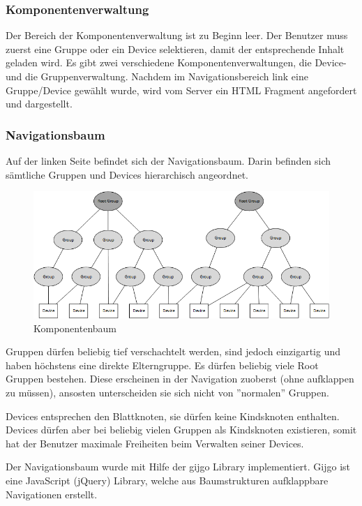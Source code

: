 \subsubsection{Komponentenverwaltung}
Der Bereich der Komponentenverwaltung ist zu Beginn leer. Der Benutzer muss zuerst eine Gruppe oder ein Device selektieren, damit der entsprechende Inhalt geladen wird. Es gibt zwei verschiedene Komponentenverwaltungen, die Device- und die Gruppenverwaltung. Nachdem im Navigationsbereich link eine Gruppe/Device gewählt wurde, wird vom Server ein HTML Fragment angefordert und dargestellt.

\subsubsection{Navigationsbaum}
Auf der linken Seite befindet sich der Navigationsbaum. Darin befinden sich sämtliche Gruppen und Devices hierarchisch angeordnet. 

\begin{figure}[H]
\centering
\includegraphics[scale=0.84]{../04_Realisierung/images/userinterface/componentstree.png}
\caption{Komponentenbaum}
\end{figure}

Gruppen dürfen beliebig tief verschachtelt werden, sind jedoch einzigartig und haben höchstens eine direkte Elterngruppe. Es dürfen beliebig viele Root Gruppen bestehen. Diese erscheinen in der Navigation zuoberst (ohne aufklappen zu müssen), ansosten unterscheiden sie sich nicht von ''normalen'' Gruppen. 

Devices entsprechen den Blattknoten, sie dürfen keine Kindsknoten enthalten. Devices dürfen aber bei beliebig vielen Gruppen als Kindsknoten existieren, somit hat der Benutzer maximale Freiheiten beim Verwalten seiner Devices.

Der Navigationsbaum wurde mit Hilfe der gijgo Library implementiert. Gijgo ist eine JavaScript (jQuery) Library, welche aus Baumstrukturen aufklappbare Navigationen erstellt.

